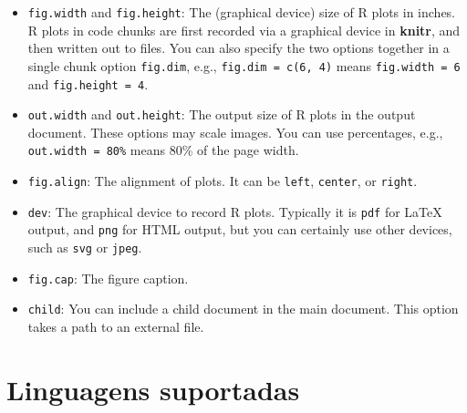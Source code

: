 \documentclass[
]{book}
\newenvironment{Shaded}{\begin{snugshade}}{\end{snugshade}}
\newcommand{\KeywordTok}[1]{\textcolor[rgb]{0.13,0.29,0.53}{\textbf{#1}}}
\newcommand{\NormalTok}[1]{#1}
\newcommand{\OperatorTok}[1]{\textcolor[rgb]{0.81,0.36,0.00}{\textbf{#1}}}
\begin{document}
\begin{itemize}
\item
  \texttt{fig.width} and \texttt{fig.height}: The (graphical device) size of R plots in inches. R plots in code chunks are first recorded via a graphical device in \textbf{knitr}, and then written out to files. You can also specify the two options together in a single chunk option \texttt{fig.dim}, e.g., \texttt{fig.dim\ =\ c(6,\ 4)} means \texttt{fig.width\ =\ 6} and \texttt{fig.height\ =\ 4}.
\item
  \texttt{out.width} and \texttt{out.height}: The output size of R plots in the output document. These options may scale images. You can use percentages, e.g., \texttt{out.width\ =\ \textquotesingle{}80\%\textquotesingle{}} means 80\% of the page width.
\item
  \texttt{fig.align}: The alignment of plots. It can be \texttt{\textquotesingle{}left\textquotesingle{}}, \texttt{\textquotesingle{}center\textquotesingle{}}, or \texttt{\textquotesingle{}right\textquotesingle{}}.
\item
  \texttt{dev}: The graphical device to record R plots. Typically it is \texttt{\textquotesingle{}pdf\textquotesingle{}} for LaTeX output, and \texttt{\textquotesingle{}png\textquotesingle{}} for HTML output, but you can certainly use other devices, such as \texttt{\textquotesingle{}svg\textquotesingle{}} or \texttt{\textquotesingle{}jpeg\textquotesingle{}}.
\item
  \texttt{fig.cap}: The figure caption.
\item
  \texttt{child}: You can include a child document in the main document. This option takes a path to an external file.
\end{itemize}

\hypertarget{linguagens-suportadas}{%
\section{Linguagens suportadas}\label{linguagens-suportadas}}

\begin{Shaded}
\end{Shaded}
\end{document}
